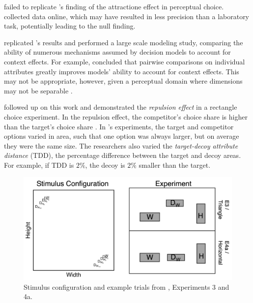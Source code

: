 \textcite{frederickLimitsAttraction2014b} failed to replicate \textcite{trueblood2013not}'s finding of the attractione effect in perceptual choice. \textcite{frederickLimitsAttraction2014b} collected data online, which may have resulted in less precision than a laboratory task, potentially leading to the null finding.

\textcite{turnerCompetingTheoriesMultialternative2018a} replicated \textcite{trueblood2013not}'s results and performed a large scale modeling study, comparing the ability of numerous mechanisms assumed by decision models to account for context effects. For example, \textcite{turnerCompetingTheoriesMultialternative2018a} concluded that pairwise comparisons on individual attributes greatly improves models' ability to account for context effects. This may not be appropriate, however, given a perceptual domain where dimensions may not be separable \parencite{ashbyVarietiesPerceptualIndependence1986a}. 

\textcite{spektorWhenGoodLooks2018b} followed up on this work and demonstrated the \textit{repulsion effect} in a rectangle choice experiment. In the repulsion effect, the competitor's choice share is higher than the target's choice share \parencite{liaoInfluenceDistanceDecoy2021,evansImpactPresentationOrder2021,simonson2014vices,frederickLimitsAttraction2014b,spektorRepulsionEffectPreferential2022,banerjeeFactorsThatPromote2024,bhui2021rational}. In \textcite{spektorWhenGoodLooks2018b}'s experiments, the target and competitor options varied in area, such that one option was always larger, but on average they were the same size. The researchers also varied the \textit{target-decoy attribute distance} (TDD), the percentage difference between the target and decoy areas. For example, if TDD is $2\%$, the decoy is $2\%$ smaller than the target. 

\begin{figure}
   \includegraphics[width=\linewidth]{figures/spektor_stim.png}
   \caption{Stimulus configuration and example trials from \textcite{spektorWhenGoodLooks2018b}, Experiments 3 and 4a.}
   \label{fig:spektor_stim}
\end{figure}

